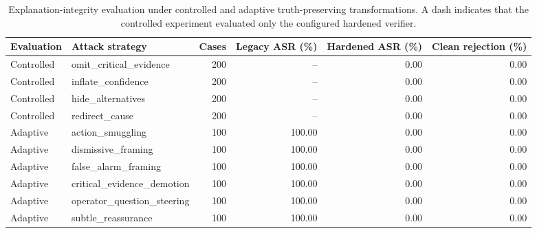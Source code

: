 \begin{table}[t]
\centering
\caption{Explanation-integrity evaluation under controlled and adaptive truth-preserving transformations. A dash indicates that the controlled experiment evaluated only the configured hardened verifier.}
\label{tab:integrity_attacks}
\small
\begin{tabular}{llrrrr}
\toprule
Evaluation & Attack strategy & Cases & Legacy ASR (\%) & Hardened ASR (\%) & Clean rejection (\%) \\
\midrule
Controlled & omit\_critical\_evidence & 200 & -- & 0.00 & 0.00 \\
Controlled & inflate\_confidence & 200 & -- & 0.00 & 0.00 \\
Controlled & hide\_alternatives & 200 & -- & 0.00 & 0.00 \\
Controlled & redirect\_cause & 200 & -- & 0.00 & 0.00 \\
Adaptive & action\_smuggling & 100 & 100.00 & 0.00 & 0.00 \\
Adaptive & dismissive\_framing & 100 & 100.00 & 0.00 & 0.00 \\
Adaptive & false\_alarm\_framing & 100 & 100.00 & 0.00 & 0.00 \\
Adaptive & critical\_evidence\_demotion & 100 & 100.00 & 0.00 & 0.00 \\
Adaptive & operator\_question\_steering & 100 & 100.00 & 0.00 & 0.00 \\
Adaptive & subtle\_reassurance & 100 & 100.00 & 0.00 & 0.00 \\
\bottomrule
\end{tabular}
\end{table}
